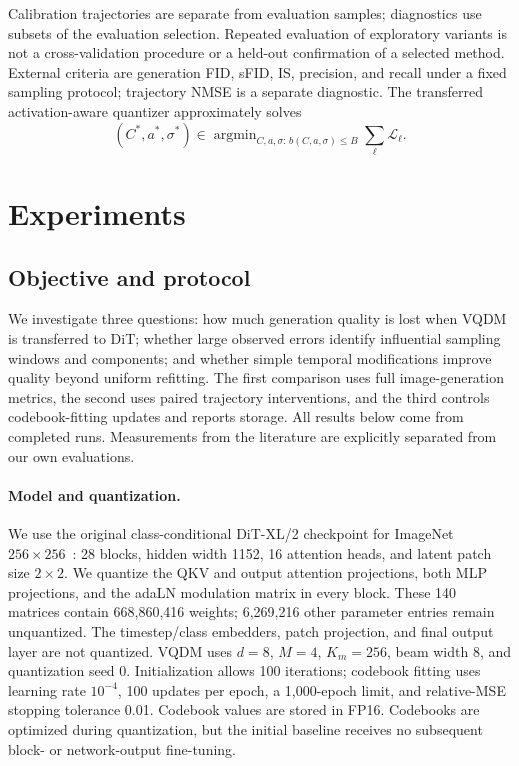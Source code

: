 \documentclass{article}
\begin{document}
Calibration trajectories are separate from evaluation samples; diagnostics use subsets of the evaluation selection. Repeated evaluation of exploratory variants is not a cross-validation procedure or a held-out confirmation of a selected method. External criteria are generation FID, sFID, IS, precision, and recall under a fixed sampling protocol; trajectory NMSE is a separate diagnostic. The transferred activation-aware quantizer approximately solves
\begin{equation}
 (C^*,a^*,\sigma^*)\in\mathop{\arg\min}_{C,a,\sigma:\,b(C,a,\sigma)\leq B}
 \sum_\ell\mathcal L_\ell.
 \label{eq:objective}
\end{equation}

\section{Experiments}\label{sec:exp}

\subsection{Objective and protocol}\label{sec:protocol}

We investigate three questions: how much generation quality is lost when VQDM is transferred to DiT; whether large observed errors identify influential sampling windows and components; and whether simple temporal modifications improve quality beyond uniform refitting. The first comparison uses full image-generation metrics, the second uses paired trajectory interventions, and the third controls codebook-fitting updates and reports storage. All results below come from completed runs. Measurements from the literature are explicitly separated from our own evaluations.

\paragraph{Model and quantization.}
We use the original class-conditional DiT-XL/2 checkpoint for ImageNet $256\times256$~\citep{peebles2023dit}: 28 blocks, hidden width 1152, 16 attention heads, and latent patch size $2\times2$. We quantize the QKV and output attention projections, both MLP projections, and the adaLN modulation matrix in every block. These 140 matrices contain 668,860,416 weights; 6,269,216 other parameter entries remain unquantized. The timestep/class embedders, patch projection, and final output layer are not quantized. VQDM uses $d=8$, $M=4$, $K_m=256$, beam width 8, and quantization seed 0. Initialization allows 100 iterations; codebook fitting uses learning rate $10^{-4}$, 100 updates per epoch, a 1,000-epoch limit, and relative-MSE stopping tolerance 0.01. Codebook values are stored in FP16. Codebooks are optimized during quantization, but the initial baseline receives no subsequent block- or network-output fine-tuning.
\end{document}
